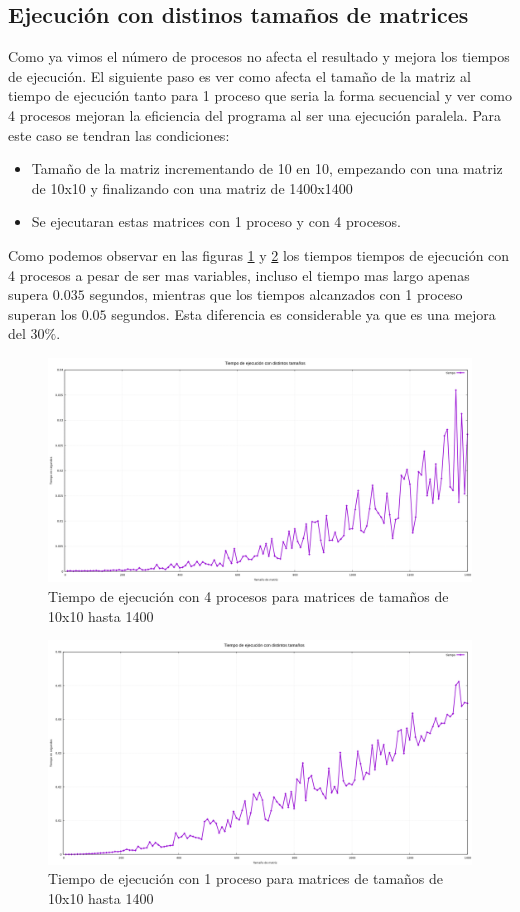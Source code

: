 \documentclass[10pt]{IEEEtran}
\begin{document}
\subsection{Ejecución con distinos tamaños de matrices}
Como ya vimos el número de procesos no afecta el resultado y mejora los tiempos de ejecución. El siguiente paso es ver como afecta el tamaño de la matriz al tiempo de ejecución tanto para 1 proceso que seria la forma secuencial y ver como 4 procesos mejoran la eficiencia del programa al ser una ejecución paralela. Para este caso se tendran las condiciones:

\begin{itemize}
  \item Tamaño de la matriz incrementando de 10 en 10, empezando con una matriz de 10x10 y finalizando con una matriz de 1400x1400
  \item Se ejecutaran estas matrices con 1 proceso y con 4 procesos.
\end{itemize}

Como podemos observar en las figuras \ref{fig:4np} y \ref{fig:1np} los tiempos tiempos de ejecución con 4 procesos a pesar de ser mas variables, incluso el tiempo mas largo apenas supera $0.035$ segundos, mientras que los tiempos alcanzados con 1 proceso superan los $0.05$ segundos. Esta diferencia es considerable ya que es una mejora del $30\%$.

\begin{figure}%
  \centering
  \includegraphics[width=0.8\linewidth]{tiempoOrdenes.png}
  \caption{Tiempo de ejecución con 4 procesos para matrices de tamaños de 10x10 hasta 1400}
  \label{fig:4np}
\end{figure}

\begin{figure}%
  \centering
  \includegraphics[width=0.8\linewidth]{tiempoOrdenesnp1.png}
  \caption{Tiempo de ejecución con 1 proceso para matrices de tamaños de 10x10 hasta 1400}
  \label{fig:1np}
\end{figure}
\end{document}
